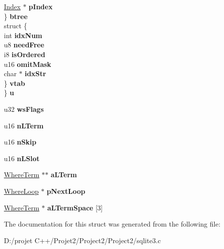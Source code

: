 \begin{DoxyCompactItemize}
\begin{tabbing}
\>\>\mbox{\hyperlink{struct_index}{Index}} $\ast$ {\bfseries pIndex}\\
\>\} {\bfseries btree}\\
\>struct \{\\
\>\>int {\bfseries idxNum}\\
\>\>u8 {\bfseries needFree}\\
\>\>i8 {\bfseries isOrdered}\\
\>\>u16 {\bfseries omitMask}\\
\>\>char $\ast$ {\bfseries idxStr}\\
\>\} {\bfseries vtab}\\
\} {\bfseries u}\\

\end{tabbing}\item 
\mbox{\label{struct_where_loop_a0cd1e9719a060631a647738bead23b8c}} 
u32 {\bfseries ws\+Flags}
\item 
\mbox{\label{struct_where_loop_aaab088ed5c23647675e5afb10eb09338}} 
u16 {\bfseries n\+L\+Term}
\item 
\mbox{\label{struct_where_loop_aa6729780dfb942387abc2f1e0a6b94e7}} 
u16 {\bfseries n\+Skip}
\item 
\mbox{\label{struct_where_loop_a286a5e96fcc56cc835958ec2cbf6852f}} 
u16 {\bfseries n\+L\+Slot}
\item 
\mbox{\label{struct_where_loop_ad8ea95e5ef2717fbbe1c1732d3ce1a9b}} 
\mbox{\hyperlink{struct_where_term}{Where\+Term}} $\ast$$\ast$ {\bfseries a\+L\+Term}
\item 
\mbox{\label{struct_where_loop_a568852114be14c3a23cef6f8a1c98f4f}} 
\mbox{\hyperlink{struct_where_loop}{Where\+Loop}} $\ast$ {\bfseries p\+Next\+Loop}
\item 
\mbox{\label{struct_where_loop_a1e0a39de75d4288c791c29e2ebf8103a}} 
\mbox{\hyperlink{struct_where_term}{Where\+Term}} $\ast$ {\bfseries a\+L\+Term\+Space} \mbox{[}3\mbox{]}
\end{DoxyCompactItemize}


The documentation for this struct was generated from the following file\+:\begin{DoxyCompactItemize}
\item 
D\+:/projet C++/\+Projet2/\+Project2/\+Project2/sqlite3.\+c\end{DoxyCompactItemize}
